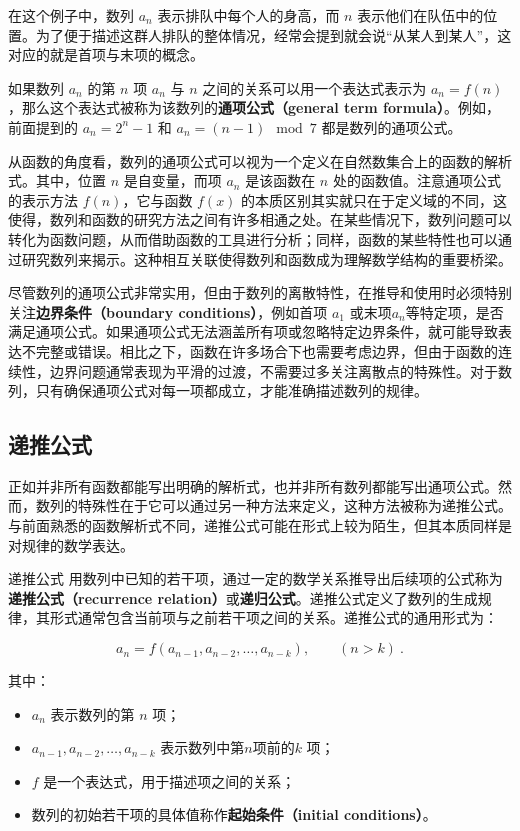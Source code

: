 在这个例子中，数列 ${a_n}$ 表示排队中每个人的身高，而 $n$ 表示他们在队伍中的位置。为了便于描述这群人排队的整体情况，经常会提到就会说“从某人到某人”，这对应的就是首项与末项的概念。

如果数列 ${a_n}$ 的第 $n$ 项 $a_n$ 与 $n$ 之间的关系可以用一个表达式表示为 $a_n = f(n)$，那么这个表达式被称为该数列的\textbf{通项公式（general term formula）}。例如，前面提到的 $a_n = 2^n - 1$ 和 $a_n = (n-1) \mod 7$ 都是数列的通项公式。

从函数的角度看，数列的通项公式可以视为一个定义在自然数集合上的函数的解析式。其中，位置 $n$ 是自变量，而项 $a_n$ 是该函数在 $n$ 处的函数值。注意通项公式的表示方法 $f(n)$，它与函数 $f(x)$ 的本质区别其实就只在于定义域的不同，这使得，数列和函数的研究方法之间有许多相通之处。在某些情况下，数列问题可以转化为函数问题，从而借助函数的工具进行分析；同样，函数的某些特性也可以通过研究数列来揭示。这种相互关联使得数列和函数成为理解数学结构的重要桥梁。

尽管数列的通项公式非常实用，但由于数列的离散特性，在推导和使用时必须特别关注\textbf{边界条件（boundary conditions）}，例如首项 $a_1$ 或末项$a_n$等特定项，是否满足通项公式。如果通项公式无法涵盖所有项或忽略特定边界条件，就可能导致表达不完整或错误。相比之下，函数在许多场合下也需要考虑边界，但由于函数的连续性，边界问题通常表现为平滑的过渡，不需要过多关注离散点的特殊性。对于数列，只有确保通项公式对每一项都成立，才能准确描述数列的规律。

\subsection{递推公式}

正如并非所有函数都能写出明确的解析式，也并非所有数列都能写出通项公式。然而，数列的特殊性在于它可以通过另一种方法来定义，这种方法被称为递推公式。与前面熟悉的函数解析式不同，递推公式可能在形式上较为陌生，但其本质同样是对规律的数学表达。

\begin{definition}{递推公式}
用数列中已知的若干项，通过一定的数学关系推导出后续项的公式称为\textbf{递推公式（recurrence relation）}或\textbf{递归公式}。递推公式定义了数列的生成规律，其形式通常包含当前项与之前若干项之间的关系。递推公式的通用形式为：

\begin{equation}
a_n = f(a_{n-1}, a_{n-2}, \dots, a_{n-k}),\qquad(n>k)~.
\end{equation}

其中：
\begin{itemize}
\item $a_n$ 表示数列的第 $n$ 项；
\item $a_{n-1}, a_{n-2}, \dots, a_{n-k}$ 表示数列中第$n$项前的$k$ 项；
\item $f$ 是一个表达式，用于描述项之间的关系；
\item 数列的初始若干项的具体值称作\textbf{起始条件（initial conditions）}。
\end{itemize}
\end{definition}

